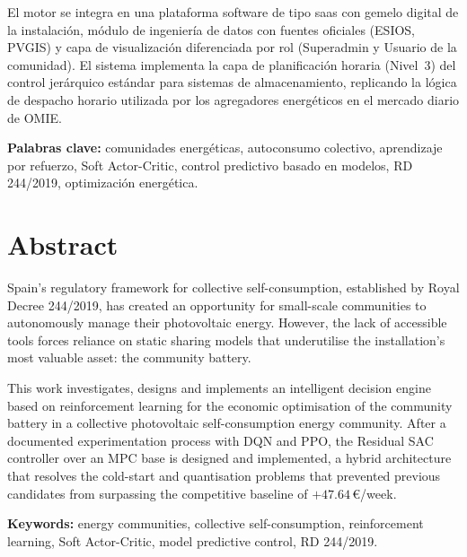 \documentclass[12pt, a4paper, twoside]{report}
\begin{document}
El motor se integra en una plataforma software de tipo \acrshort{saas} con
gemelo digital de la instalación, módulo de ingeniería de datos con fuentes
oficiales (ESIOS, PVGIS) y capa de visualización diferenciada por rol
(Superadmin y Usuario de la comunidad). El sistema implementa la capa de
planificación horaria (Nivel~3) del control jerárquico estándar para sistemas
de almacenamiento, replicando la lógica de despacho horario utilizada por
los agregadores energéticos en el mercado diario de OMIE.

\textbf{Palabras clave:} comunidades energéticas, autoconsumo colectivo,
aprendizaje por refuerzo, Soft Actor-Critic, control predictivo basado en
modelos, RD 244/2019, optimización energética.

\chapter*{Abstract}
\thispagestyle{plain}

Spain's regulatory framework for collective self-consumption, established by
Royal Decree 244/2019, has created an opportunity for small-scale communities
to autonomously manage their photovoltaic energy. However, the lack of
accessible tools forces reliance on static sharing models that underutilise
the installation's most valuable asset: the community battery.

This work investigates, designs and implements an intelligent decision engine
based on reinforcement learning for the economic optimisation of the community
battery in a collective photovoltaic self-consumption energy community. After
a documented experimentation process with DQN and PPO, the Residual SAC
controller over an MPC base is designed and implemented, a hybrid architecture
that resolves the cold-start and quantisation problems that prevented previous
candidates from surpassing the competitive baseline of
$+47.64$\,€/week.

\textbf{Keywords:} energy communities, collective self-consumption,
reinforcement learning, Soft Actor-Critic, model predictive control,
RD 244/2019.

\tableofcontents
\listoffigures
{}
\listoftables
{}
\printglossary[type=acronym, title={Glosario de Acrónimos}]

\setcounter{page}{1}
\end{document}
